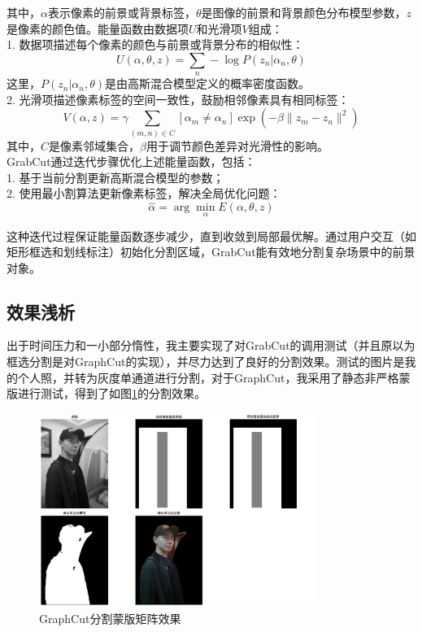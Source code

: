 \documentclass[UTF8]{ctexart}
\begin{document}
其中，$\alpha$表示像素的前景或背景标签，$\theta$是图像的前景和背景颜色分布模型参数，$z$\\是像素的颜色值。能量函数由数据项$U$和光滑项$V$组成：\\
1. 数据项描述每个像素的颜色与前景或背景分布的相似性：
\[
U(\alpha, \theta, z) = \sum_{n} -\log P(z_n | \alpha_n, \theta)
\]
这里，\(P(z_n | \alpha_n, \theta)\)是由高斯混合模型定义的概率密度函数。\\
2. 光滑项描述像素标签的空间一致性，鼓励相邻像素具有相同标签：
\[
V(\alpha, z) = \gamma \sum_{(m,n)\in C} [\alpha_m \neq \alpha_n] \exp(-\beta \|z_m - z_n\|^2)
\]
其中，\(C\)是像素邻域集合，\(\beta\)用于调节颜色差异对光滑性的影响。\\
GrabCut通过迭代步骤优化上述能量函数，包括：\\
1. 基于当前分割更新高斯混合模型的参数；\\
2. 使用最小割算法更新像素标签，解决全局优化问题：
\[
\hat{\alpha} = \arg\min_{\alpha} E(\alpha, \theta, z)
\]

这种迭代过程保证能量函数逐步减少，直到收敛到局部最优解。通过用户交互（如矩形框选和划线标注）初始化分割区域，GrabCut能有效地分割复杂场景中的前景对象。
\subsection{效果浅析}
出于时间压力和一小部分惰性，我主要实现了对GrabCut的调用测试（并且原以为框选分割是对GraphCut的实现），并尽力达到了良好的分割效果。测试的图片是我的个人照，并转为灰度单通道进行分割，对于GraphCut，我采用了静态非严格蒙版进行测试，得到了如图\ref{fig:GraphCut}的分割效果。
\begin{figure}[htbp]
\centering
\includegraphics[width=0.8\textwidth]{./images/GraphCut.png}
\caption{GraphCut分割蒙版矩阵效果}
\label{fig:GraphCut}
\end{figure}
\end{document}
